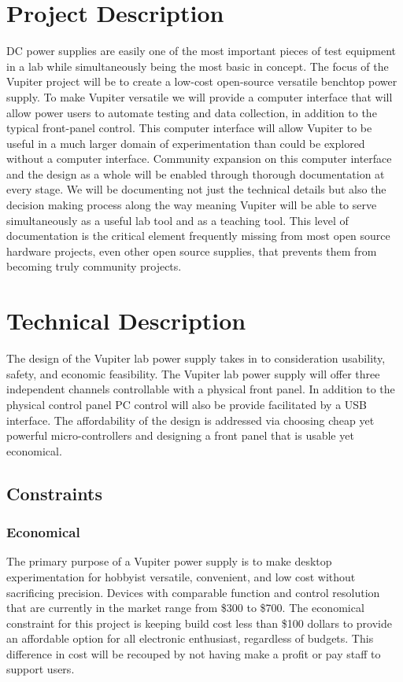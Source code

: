 \documentclass[12pt]{article}
\begin{document}
\section{Project Description}
DC power supplies are easily one of the most important pieces of test equipment 
in a lab while simultaneously being the most basic in concept. The focus of the 
Vupiter project will be to create a low-cost open-source versatile benchtop power 
supply. To make Vupiter versatile we will provide a computer interface that will 
allow power users to automate testing and data collection, in addition to the 
typical front-panel control. This computer interface will allow Vupiter to be 
useful in a much larger domain of experimentation than could be explored without a computer interface. 
Community expansion on this computer interface and the design as a whole will be 
enabled through thorough documentation at every stage. We will be documenting not 
just the technical details but also the decision making process along the way meaning 
Vupiter will be able to serve simultaneously as a useful lab tool and as a teaching 
tool. This level of documentation is the critical element frequently missing from most 
open source hardware projects, even other open source supplies, that prevents them 
from becoming truly community projects.
\section{Technical Description}
The design of the Vupiter lab power supply takes in to consideration usability, 
safety, and economic feasibility.  The Vupiter lab power supply will offer 
three independent channels controllable with a physical front panel. In addition 
to the physical control panel PC control will also be provide facilitated by a 
USB interface. The affordability of the design is addressed via choosing cheap 
yet powerful micro-controllers and designing a front panel that is usable yet 
economical.


\subsection{Constraints}
\subsubsection{Economical}
The primary purpose of a Vupiter power supply is to make desktop experimentation for 
hobbyist versatile, convenient, and low cost without sacrificing precision. Devices 
with comparable function and control resolution that are currently in the market 
range from \$300 to \$700. The economical constraint for this project is keeping 
build cost less than \$100 dollars to provide an affordable option for all electronic 
enthusiast, regardless of budgets. This difference in cost will be recouped by not having 
make a profit or pay staff to support users.
\end{document}
